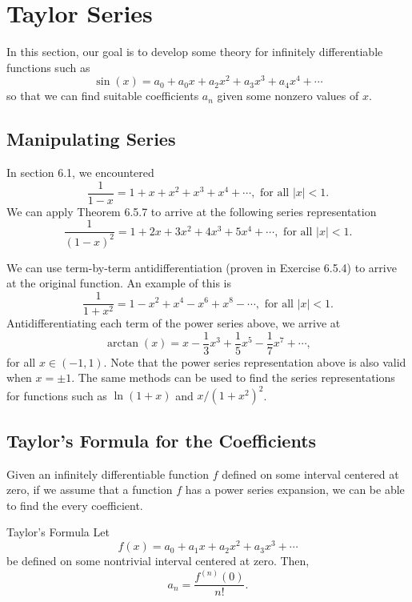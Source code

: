 \section{Taylor Series}

In this section, our goal is to develop some theory for infinitely differentiable functions such as 
    \[  \sin(x) = a_0 + a_{0} x  + a_{2} x^{2} + a_{3} x^{3} + a_{4} x^{4} + \dotsb \]
so that we can find suitable coefficients \( a_{n} \) given some nonzero values of \( x  \).

\subsection{Manipulating Series}
In section 6.1, we encountered 
\[  \frac{ 1 }{ 1-x  } = 1 + x + x^{2} + x^{3} + x^{4} + \dotsb, \text{ for all } | x  | < 1. \tag{1} \]
We can apply Theorem 6.5.7 to arrive at the following series representation
\[  \frac{ 1 }{ (1-x)^2  } = 1 + 2x + 3 x^{2} + 4 x^{3} + 5 x^{4} + \dotsb, \text{ for all } | x  | < 1.   \]

We can use term-by-term antidifferentiation (proven in Exercise 6.5.4) to arrive at the original function. An example of this is 
\[  \frac{ 1 }{ 1 + x^2  }  = 1 - x^{2} + x^{4 } - x^{6 } + x^{8 } - \dotsb, \text{ for all } | x  | < 1. \]
Antidifferentiating each term of the power series above, we arrive at 
\[  \arctan(x) = x - \frac{ 1 }{ 3 }  x^{3} + \frac{ 1 }{ 5 } x^{5} - \frac{ 1 }{ 7 } x^{7} + \dotsb,  \]
for all \( x \in (-1,1) \). Note that the power series representation above is also valid when \( x = \pm 1  \). The same methods can be used to find the series representations for functions such as \( \ln ( 1 + x ) \) and \( x  / (1 + x^2 )^2 \).

\subsection{Taylor's Formula for the Coefficients} 

Given an infinitely differentiable function \( f  \) defined on some interval centered at zero, if we assume that a function \( f  \) has a power series expansion, we can be able to find the every coefficient.

\begin{theorem}{Taylor's Formula}{}
    Let 
    \[  f(x) = a_0 + a_{1}x + a_{2} x^{2} + a_{3} x^{3} + \dotsb \]
    be defined on some nontrivial interval centered at zero. Then, 
    \[ a_n = \frac{ f^{(n)}(0) }{ n! }. \]
    \end{theorem}

